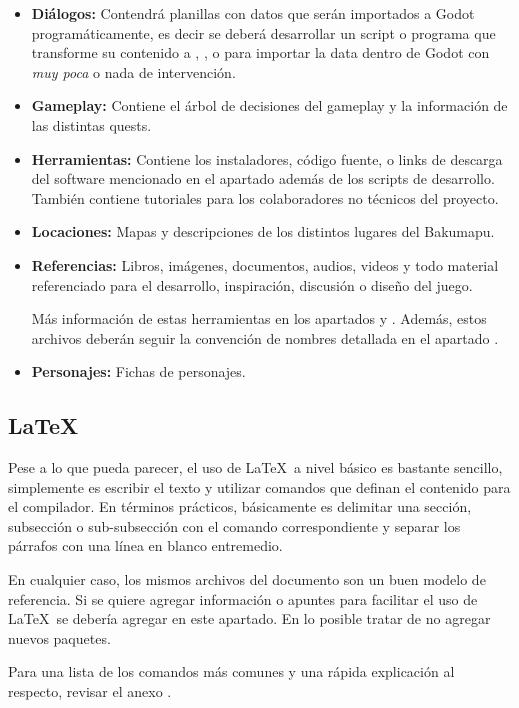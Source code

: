 \begin{itemize}

	\item \textbf{Diálogos:} Contendrá planillas con datos que serán importados a Godot programáticamente, es decir se deberá desarrollar un script o programa que transforme su contenido a ,  , o  para importar la data dentro de Godot con \emph{muy poca} o nada de intervención.

	\item \textbf{Gameplay:} Contiene el árbol de decisiones del gameplay y la información de las distintas quests.
	
	\item \textbf{Herramientas:} Contiene los instaladores, código fuente, o links de descarga del software mencionado en el apartado  además de los scripts de desarrollo. También contiene tutoriales para los colaboradores no técnicos del proyecto.
	
	\item \textbf{Locaciones:} Mapas y descripciones de los distintos lugares del Bakumapu.
	
	\item \textbf{Referencias:} Libros, imágenes, documentos, audios, videos y todo material referenciado para el desarrollo, inspiración, discusión o diseño del juego.

	Más información de estas herramientas en los apartados  y . Además, estos archivos deberán seguir la convención de nombres detallada en el apartado .
	
	\item \textbf{Personajes:} Fichas de personajes.
	
\end{itemize}


\subsection{LaTeX}\label{flujo:latex}
Pese a lo que pueda parecer, el uso de \LaTeX\ a nivel básico es bastante sencillo, simplemente es escribir el texto y utilizar comandos que definan el contenido para el compilador. En términos prácticos, básicamente es delimitar una sección, subsección o sub-subsección con el comando correspondiente y separar los párrafos con una línea en blanco entremedio.

En cualquier caso, los mismos archivos  del documento son un buen modelo de referencia. Si se quiere agregar información o apuntes para facilitar el uso de \LaTeX\ se debería agregar en este apartado. En lo posible tratar de no agregar nuevos paquetes.

Para una lista de los comandos más comunes y una rápida explicación al respecto, revisar el anexo .
